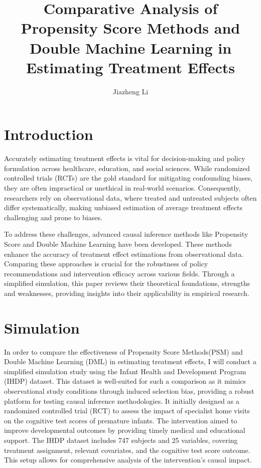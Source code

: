 \documentclass{article}
\title{Comparative Analysis of Propensity Score Methods and Double Machine Learning in Estimating Treatment Effects}
\author{Jiazheng Li}
\begin{document}
\maketitle


\section{Introduction}
Accurately estimating treatment effects is vital for decision-making and policy formulation across healthcare, education, and social sciences. While randomized controlled trials (RCTs) are the gold standard for mitigating confounding biases, they are often impractical or unethical in real-world scenarios. Consequently, researchers rely on observational data, where treated and untreated subjects often differ systematically, making unbiased estimation of average treatment effects challenging and prone to biases.

To address these challenges, advanced causal inference methods like Propensity Score  and Double Machine Learning have been developed. These methods enhance the accuracy of treatment effect estimations from observational data. Comparing these approaches is crucial for the robustness of policy recommendations and intervention efficacy across various fields. Through a simplified simulation, this paper reviews their theoretical foundations, strengths and weaknesses, providing insights into their applicability in empirical research.


\section{Simulation}
In order to compare the effectiveness of Propensity Score Methods(PSM) and Double Machine Learning (DML) in estimating treatment effects, I will conduct a simplified  simulation study using the Infant Health and Development Program (IHDP) dataset. This dataset is well-suited for such a comparison as it mimics observational study conditions through induced selection bias, providing a robust platform for testing causal inference methodologies. It initially designed as a randomized controlled trial (RCT) to assess the impact of specialist home visits on the cognitive test scores of premature infants. The intervention aimed to improve developmental outcomes by providing timely medical and educational support. The IHDP dataset includes 747 subjects and 25 variables, covering treatment assignment, relevant covariates, and the cognitive test score outcome. This setup allows for comprehensive analysis of the intervention's causal impact.
\end{document}
